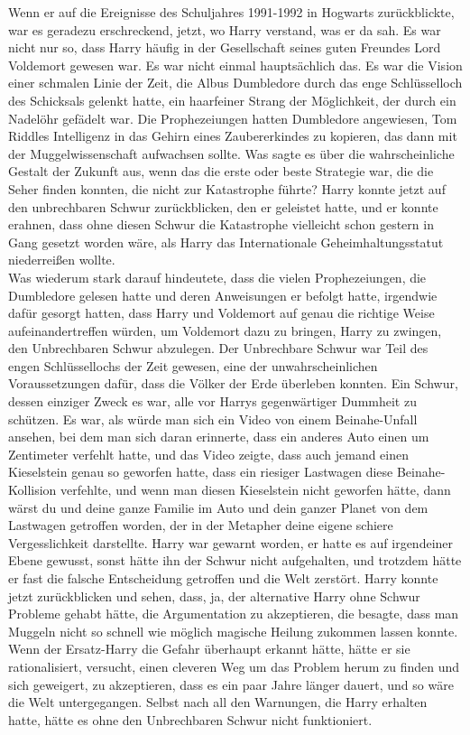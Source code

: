 {Wenn er auf die Ereignisse des Schuljahres 1991-1992 in Hogwarts zurückblickte, war es geradezu erschreckend, jetzt, wo Harry verstand, was er da sah. Es war nicht nur so, dass Harry häufig in der Gesellschaft seines guten Freundes Lord Voldemort gewesen war. Es war nicht einmal hauptsächlich das. Es war die Vision einer schmalen Linie der Zeit, die Albus Dumbledore durch das enge Schlüsselloch des Schicksals gelenkt hatte, ein haarfeiner Strang der Möglichkeit, der durch ein Nadelöhr gefädelt war. Die Prophezeiungen hatten Dumbledore angewiesen, Tom Riddles Intelligenz in das Gehirn eines Zaubererkindes zu kopieren, das dann mit der Muggelwissenschaft aufwachsen sollte. Was sagte es über die wahrscheinliche Gestalt der Zukunft aus, wenn das die erste oder beste Strategie war, die die Seher finden konnten, die nicht zur Katastrophe führte? Harry konnte jetzt auf den unbrechbaren Schwur zurückblicken, den er geleistet hatte, und er konnte erahnen, dass ohne diesen Schwur die Katastrophe vielleicht schon gestern in Gang gesetzt worden wäre, als Harry das Internationale Geheimhaltungsstatut niederreißen wollte.\\ Was wiederum stark darauf hindeutete, dass die vielen Prophezeiungen, die Dumbledore gelesen hatte und deren Anweisungen er befolgt hatte, irgendwie dafür gesorgt hatten, dass Harry und Voldemort auf genau die richtige Weise aufeinandertreffen würden, um Voldemort dazu zu bringen, Harry zu zwingen, den Unbrechbaren Schwur abzulegen. Der Unbrechbare Schwur war Teil des engen Schlüssellochs der Zeit gewesen, eine der unwahrscheinlichen Voraussetzungen dafür, dass die Völker der Erde überleben konnten. Ein Schwur, dessen einziger Zweck es war, alle vor Harrys gegenwärtiger Dummheit zu schützen. Es war, als würde man sich ein Video von einem Beinahe-Unfall ansehen, bei dem man sich daran erinnerte, dass ein anderes Auto einen um Zentimeter verfehlt hatte, und das Video zeigte, dass auch jemand einen Kieselstein genau so geworfen hatte, dass ein riesiger Lastwagen diese Beinahe-Kollision verfehlte, und wenn man diesen Kieselstein nicht geworfen hätte, dann wärst du und deine ganze Familie im Auto und dein ganzer Planet von dem Lastwagen getroffen worden, der in der Metapher deine eigene schiere Vergesslichkeit darstellte. Harry war gewarnt worden, er hatte es auf irgendeiner Ebene gewusst, sonst hätte ihn der Schwur nicht aufgehalten, und trotzdem hätte er fast die falsche Entscheidung getroffen und die Welt zerstört. Harry konnte jetzt zurückblicken und sehen, dass, ja, der alternative Harry ohne Schwur Probleme gehabt hätte, die Argumentation zu akzeptieren, die besagte, dass man Muggeln nicht so schnell wie möglich magische Heilung zukommen lassen konnte.\\ Wenn der Ersatz-Harry die Gefahr überhaupt erkannt hätte, hätte er sie rationalisiert, versucht, einen cleveren Weg um das Problem herum zu finden und sich geweigert, zu akzeptieren, dass es ein paar Jahre länger dauert, und so wäre die Welt untergegangen. Selbst nach all den Warnungen, die Harry erhalten hatte, hätte es ohne den Unbrechbaren Schwur nicht funktioniert.

}
